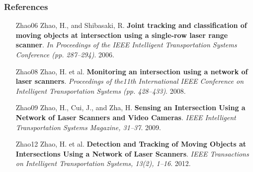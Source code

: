 \documentclass[table]{beamer}
\begin{document}
\frame
{
	\frametitle{References}
		\footnotesize{
	\begin{itemize}[leftmargin=.6in]
		\item [Zhao06] Zhao, H., and Shibasaki, R. \textbf{Joint tracking and classification of moving objects at intersection using a single-row laser range scanner}. \textit{In Proceedings of the IEEE Intelligent Transportation Systems Conference (pp. 287–294)}. 2006.
		\item [Zhao08] Zhao, H. et al.\textbf{ Monitoring an intersection using a network of laser scanners}. \textit{Proceedings of the11th International IEEE Conference on Intelligent Transportation Systems (pp. 428–433)}. 2008.
		\item [Zhao09] Zhao, H., Cui, J., and Zha, H. \textbf{Sensing an Intersection Using a Network of Laser Scanners and Video Cameras}. \textit{IEEE Intelligent Transportation Systems Magazine, 31–37}. 2009.
		\item [Zhao12] Zhao, H. et al. \textbf{Detection and Tracking of Moving Objects at Intersections Using a Network of Laser Scanners}. \textit{IEEE Transactions on Intelligent Transportation Systems, 13(2), 1–16}. 2012.

	\end{itemize}	
	}
}

%
%




%
%
%

%
%
%
%
\end{document}
